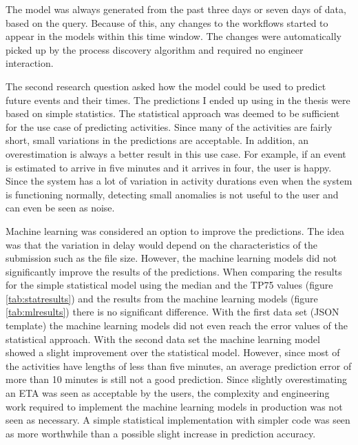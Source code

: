 The model was always generated from the past three days or seven days of data, based on the query. Because of this, any changes to the workflows started to appear in the models within this time window. 
The changes were automatically picked up by the process discovery algorithm and required no engineer interaction.

The second research question asked how the model could be used to predict future events and their times. 
The predictions I ended up using in the thesis were based on simple statistics. 
The statistical approach was deemed to be sufficient for the use case of predicting activities. 
Since many of the activities are fairly short, small variations in the predictions are acceptable. 
In addition, an overestimation is always a better result in this use case.
For example, if an event is estimated to arrive in five minutes and it arrives in four, the user is happy.
Since the system has a lot of variation in activity durations even when the system is functioning normally, detecting small anomalies is not useful to the user and can even be seen as noise.

Machine learning was considered an option to improve the predictions. The idea was that the variation in delay would depend on the characteristics of the submission such as the file size.
However, the machine learning models did not significantly improve the results of the predictions.
When comparing the results for the simple statistical model using the median and the TP75 values (figure \ref{tab:statresults}) and the results from the machine learning models (figure \ref{tab:mlresults}) there is no significant difference.
With the first data set (JSON template) the machine learning models did not even reach the error values of the statistical approach.
With the second data set the machine learning model showed a slight improvement over the statistical model.
However, since most of the activities have lengths of less than five minutes, an average prediction error of more than 10 minutes is still not a good prediction.
Since slightly overestimating an ETA was seen as acceptable by the users, the complexity and engineering work required to implement the machine learning models in production was not seen as necessary.
A simple statistical implementation with simpler code was seen as more worthwhile than a possible slight increase in prediction accuracy.

